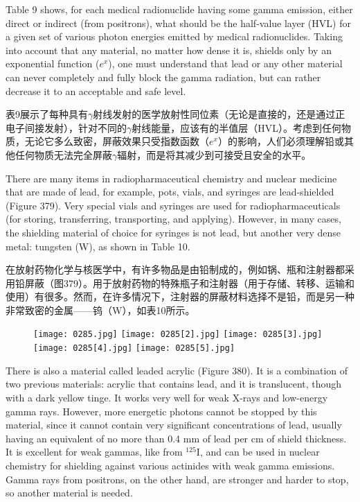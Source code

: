 \documentclass[dvipsnames, svgnames,a4paper,11pt]{article}
\begin{document}
Table 9 shows, for each medical radionuclide having some gamma emission, either direct or indirect (from positrons), what should be the half-value layer (HVL) for a given set of various photon energies emitted by medical radionuclides. Taking into account that any material, no matter how dense it is, shields only by an exponential function (\( e^x \)), one must understand that lead or any other material can never completely and fully block the gamma radiation, but can rather decrease it to an acceptable and safe level.

表9展示了每种具有$\gamma$射线发射的医学放射性同位素（无论是直接的，还是通过正电子间接发射），针对不同的$\gamma$射线能量，应该有的半值层（HVL）。考虑到任何物质，无论它多么致密，屏蔽效果只受指数函数（\( e^x \)）的影响，人们必须理解铅或其他任何物质无法完全屏蔽$\gamma$辐射，而是将其减少到可接受且安全的水平。

There are many items in radiopharmaceutical chemistry and nuclear medicine that are made of lead, for example, pots, vials, and syringes are lead-shielded (Figure 379). Very special vials and syringes are used for radiopharmaceuticals (for storing, transferring, transporting, and applying). However, in many cases, the shielding material of choice for syringes is not lead, but another very dense metal: tungsten (W), as shown in Table 10.

在放射药物化学与核医学中，有许多物品是由铅制成的，例如锅、瓶和注射器都采用铅屏蔽（图379）。用于放射药物的特殊瓶子和注射器（用于存储、转移、运输和使用）有很多。然而，在许多情况下，注射器的屏蔽材料选择不是铅，而是另一种非常致密的金属——钨（W），如表10所示。

\begin{figure}[h]
    \centering
    \texttt{[image: 0285.jpg]} \hspace{0.1in}
    \texttt{[image: 0285[2].jpg]} \hspace{0.1in}
    \texttt{[image: 0285[3].jpg]}  \hspace{0.1in}
    \texttt{[image: 0285[4].jpg]}  \hspace{0.1in}
    \texttt{[image: 0285[5].jpg]} 
     \label{fig379}
\end{figure}

There is also a material called leaded acrylic (Figure 380). It is a combination of two previous materials: acrylic that contains lead, and it is translucent, though with a dark yellow tinge. It works very well for weak X-rays and low-energy gamma rays. However, more energetic photons cannot be stopped by this material, since it cannot contain very significant concentrations of lead, usually having an equivalent of no more than 0.4 mm of lead per cm of shield thickness. It is excellent for weak gammas, like from \(\mathrm{^{125}I}\), and can be used in nuclear chemistry for shielding against various actinides with weak gamma emissions. Gamma rays from positrons, on the other hand, are stronger and harder to stop, so another material is needed.
\end{document}
